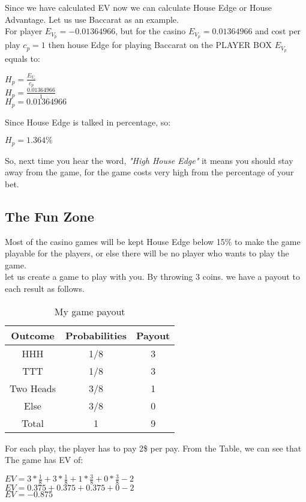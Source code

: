 \documentclass{article}
\begin{document}
Since we have calculated EV now we can calculate House Edge or House Advantage.  Let us use Baccarat as an example.\\ 

For player $E_{V_p}=-0.01364966$, but for the casino $E_{V_p}=0.01364966$ and cost per play $c_p = 1$ then house Edge for playing Baccarat on the PLAYER BOX $E_{V_p}$ equals to:\\
\begin{center}
$H_p=\frac{E_{V_c}}{c_p}$\\
$H_p=\frac{0.01364966}{1}$ \\ 
$H_p=0.01364966$ \\ 
\end{center}
Since House Edge is talked in percentage, so:\par
\begin{center}
$H_p=1.364\%$ \\ 
\end{center}

So, next time you hear the word, \emph{"High House Edge"} it means you should stay away from the game, for the game costs very high from the percentage of your bet.\\

\subsection{The Fun Zone}
Most of the casino games will be kept House Edge below 15\% to make the game playable for the players, or else there will be no player who wants to play the game.\\

let us create a game to play with you. By throwing 3 coins.  we have a payout to each result as follows.\par
\begin{table}[hbt]
\centering
\begin{tabular}{|c|c|c|}
\hline
Outcome & Probabilities & Payout \\
\hline
HHH & 1/8 & 3\\
TTT & 1/8 & 3\\
Two Heads & 3/8 & 1\\
Else & 3/8 & 0\\
\hline
Total& 1 & 9\\
\hline
\end{tabular}
\caption{My game payout}
\end{table}

For each play, the player has to pay 2\$ per pay.  From the Table, we can see that The game has EV of: \\
\begin{center}
$EV = 3*\frac{1}{8}+ 3*\frac{1}{8}+ 1*\frac{3}{8}+0*\frac{3}{8}-2$\\
$EV = 0.375+ 0.375+ 0.375+0-2$\\
$EV = -0.875$\\
\end{center}
\end{document}
